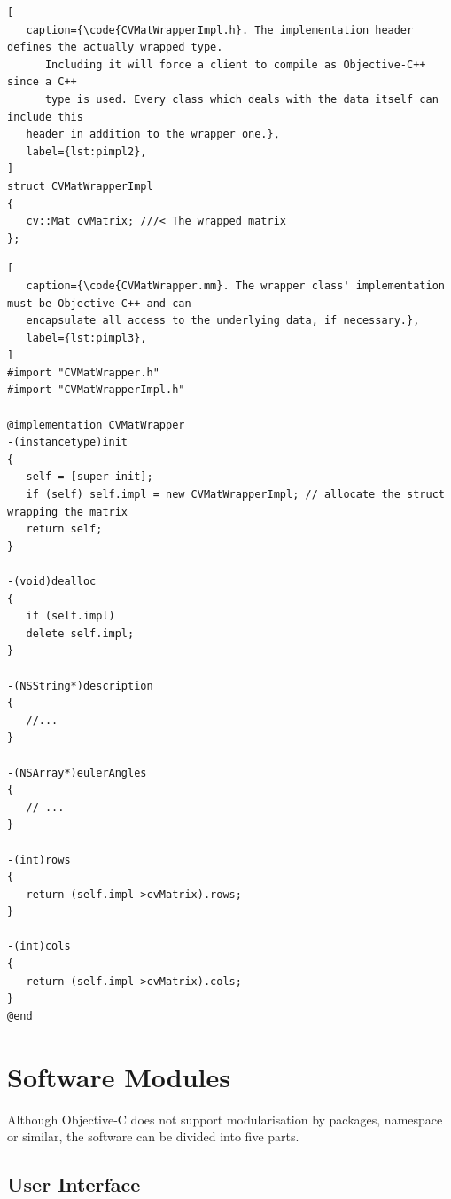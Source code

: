 \begin{lstlisting}[
   caption={\code{CVMatWrapperImpl.h}. The implementation header defines the actually wrapped type.
      Including it will force a client to compile as Objective-C++ since a C++
      type is used. Every class which deals with the data itself can include this
   header in addition to the wrapper one.},
   label={lst:pimpl2},
]
struct CVMatWrapperImpl
{
   cv::Mat cvMatrix; ///< The wrapped matrix
};
\end{lstlisting}

\begin{lstlisting}[
   caption={\code{CVMatWrapper.mm}. The wrapper class' implementation must be Objective-C++ and can
   encapsulate all access to the underlying data, if necessary.},
   label={lst:pimpl3},
]
#import "CVMatWrapper.h"
#import "CVMatWrapperImpl.h"

@implementation CVMatWrapper
-(instancetype)init
{
   self = [super init];
   if (self) self.impl = new CVMatWrapperImpl; // allocate the struct wrapping the matrix
   return self;
}

-(void)dealloc
{
   if (self.impl)
   delete self.impl;
}

-(NSString*)description
{
   //...
}

-(NSArray*)eulerAngles
{
   // ...
}

-(int)rows
{
   return (self.impl->cvMatrix).rows;
}

-(int)cols
{
   return (self.impl->cvMatrix).cols;
}
@end
\end{lstlisting}

\section{Software Modules}

Although Objective-C does not support modularisation by packages, namespace or
similar, the software can be divided into five parts.

\subsection{User Interface}

